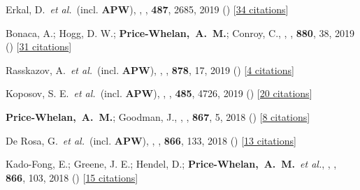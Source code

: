 \item[{\color{deemph}\scriptsize51}]Erkal, D.~\textit{et al.}~(incl. \textbf{APW}), , \mnras, \textbf{487}, 2685, 2019 () [\href{http://adsabs.harvard.edu/abs/2019MNRAS.487.2685E}{34 citations}]

\item[{\color{deemph}\scriptsize50}]Bonaca, A.; Hogg, D. W.; \textbf{Price-Whelan,~A.~M.}; Conroy, C., , \apj, \textbf{880}, 38, 2019 () [\href{http://adsabs.harvard.edu/abs/2019ApJ...880...38B}{31 citations}]

\item[{\color{deemph}\scriptsize49}]Rasskazov, A.~\textit{et al.}~(incl. \textbf{APW}), , \apj, \textbf{878}, 17, 2019 () [\href{http://adsabs.harvard.edu/abs/2019ApJ...878...17R}{4 citations}]

\item[{\color{deemph}\scriptsize48}]Koposov, S. E.~\textit{et al.}~(incl. \textbf{APW}), , \mnras, \textbf{485}, 4726, 2019 () [\href{http://adsabs.harvard.edu/abs/2019MNRAS.485.4726K}{20 citations}]

\item[{\color{deemph}\scriptsize47}]\textbf{Price-Whelan,~A.~M.}; Goodman, J., , \apj, \textbf{867}, 5, 2018 () [\href{http://adsabs.harvard.edu/abs/2018ApJ...867....5P}{8 citations}]

\item[{\color{deemph}\scriptsize46}]De Rosa, G.~\textit{et al.}~(incl. \textbf{APW}), , \apj, \textbf{866}, 133, 2018 () [\href{http://adsabs.harvard.edu/abs/2018ApJ...866..133D}{13 citations}]

\item[{\color{deemph}\scriptsize45}]Kado-Fong, E.; Greene, J. E.; Hendel, D.; \textbf{Price-Whelan,~A.~M.}~\textit{et al.}, , \apj, \textbf{866}, 103, 2018 () [\href{http://adsabs.harvard.edu/abs/2018ApJ...866..103K}{15 citations}]

